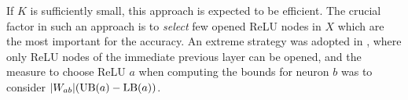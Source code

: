 If $K$ is sufficiently small, 
this approach is expected to be efficient. 
The crucial factor in such an approach is to {\em select} few opened ReLU nodes in $X$ which are the most important for the accuracy. An extreme strategy was adopted in 
\cite{DivideAndSlide}, where only ReLU nodes of the immediate previous layer can be opened, and the measure to choose ReLU $a$ when computing the bounds for neuron $b$ was to consider $|W_{ab}| (\mathrm{UB}(a)-\mathrm{LB}(a))$. 
